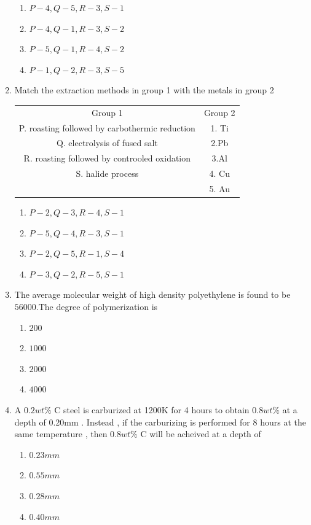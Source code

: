 \documentclass[journal]{IEEEtran}
\theoremstyle{remark}
\begin{document}
\begin{enumerate}
\begin{multicols}{2}
\begin{enumerate}
    \item $P-4,Q-5,R-3,S-1$
    \item $P-4,Q-1,R-3,S-2$
    \item $P-5,Q-1,R-4,S-2$
    \item $P-1,Q-2,R-3,S-5$
\end{enumerate}
\end{multicols}
\item  Match the extraction methods in group 1 with the metals in group 2 \hfill{}
\begin{center}
\begin{tabular}{c c}
Group 1     &Group 2  \\
P. roasting followed by carbothermic reduction     & 1. Ti\\
Q. electrolysis of fused salt & 2.Pb\\
R. roasting followed by controoled oxidation & 3.Al\\
S. halide process & 4. Cu\\
      &5. Au
\end{tabular}
\end{center}

\begin{multicols}{2}
\begin{enumerate}
\item $P-2,Q-3,R-4,S-1$
\item $P-5,Q-4,R-3,S-1$
\item $P-2,Q-5,R-1,S-4$
\item $P-3,Q-2,R-5,S-1$
\end{enumerate}
\end{multicols}

\item  The average molecular weight of high density polyethylene is found to be $56000$.The degree of polymerization is \hfill{}
\begin{multicols}{4}
\begin{enumerate}
\item $200$
\item $1000$
\item $2000$
\item $4000$
\end{enumerate}
\end{multicols}

\item A $0.2wt\%$ C steel is carburized at 1200K for 4 hours to obtain $0.8wt\%$ at a depth of 0.20mm . Instead , if the carburizing is performed for 8 hours at the same temperature , then $0.8wt\%$ C will be acheived at a depth of
\hfill{}
\begin{multicols}{4}
\begin{enumerate}
\item $0.23mm$
\item $0.55mm$
\item $0.28mm$
\item $0.40mm$
\end{enumerate}
\end{multicols}


\end{enumerate}
\end{document}
